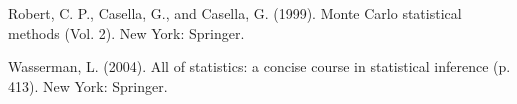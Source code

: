 \documentclass[a4paper, 11pt]{article}
\begin{document}
\newpage



\begin{thebibliography}{9}

    Robert, C. P., Casella, G., and Casella, G. (1999). Monte Carlo statistical methods (Vol. 2). New York: Springer.

    Wasserman, L. (2004). All of statistics: a concise course in statistical inference (p. 413). New York: Springer.
    
\end{thebibliography}
      
\end{document}
